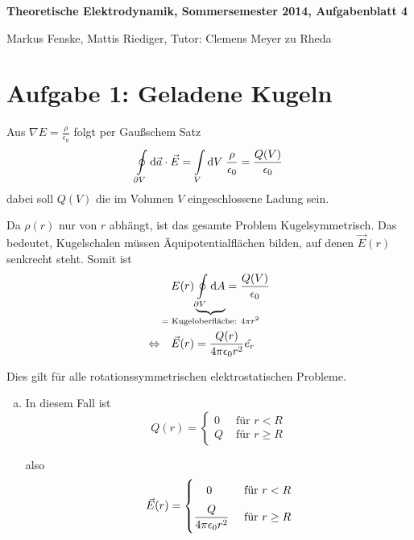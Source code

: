 \documentclass[a4paper,german,12pt,smallheadings]{scrartcl}
\begin{document}
\allowdisplaybreaks %
\begin{center}
\bfseries %
\sffamily %
\vspace{-40pt}
Theoretische Elektrodynamik, Sommersemester 2014, Aufgabenblatt 4

Markus Fenske, Mattis Riediger, Tutor: Clemens Meyer zu Rheda
\vspace{-10pt}
\end{center}

\section*{Aufgabe 1: Geladene Kugeln}
Aus $\nabla E = \frac{\rho}{\epsilon_0}$ folgt per Gaußschem Satz
\begin{equation}
  \oint\limits_{\partial V} \dif \vec{a} \cdot \vec{E} = \int\limits_{V} \dif V \; \frac{\rho}{\epsilon_0} = \frac{Q(V)}{\epsilon_0}
\end{equation}
dabei soll $Q(V)$ die im Volumen $V$ eingeschlossene Ladung sein.

Da $\rho(r)$ nur von $r$ abhängt, ist das gesamte Problem Kugelsymmetrisch.
Das bedeutet, Kugelschalen müssen Äquipotentialflächen bilden, auf denen
$\vec{E}(r)$ senkrecht steht. Somit ist
\begin{align}
  &E(r) \underbrace{\oint\limits_{\partial V} \dif A}_{\mathclap{= \text{ Kugeloberfläche: } 4 \pi r^2}} = \frac{Q(V)}{\epsilon_0} \\
  \Leftrightarrow\quad
  & \vec{E}(r) = \frac{Q(r)}{4 \pi \epsilon_0 r^2} \hat{e_r}
\end{align}

Dies gilt für alle rotationssymmetrischen elektrostatischen Probleme.

\begin{enumerate}[a)]
  \item
    In diesem Fall ist
    \begin{equation}
      Q(r) = \begin{cases}
        0 & \text{ für } r < R \\
        Q & \text{ für } r \ge R
      \end{cases}
    \end{equation}

    also
    \begin{equation}
      \vec{E}(r) = \begin{cases}
        \; \; \; \; 0 & \text{ für } r < R
        \vspace{0.2 cm} \\
        \dfrac{Q}{4 \pi \epsilon_0 r^2} & \text{ für } r \ge R
      \end{cases}
    \end{equation}

\end{enumerate}
\end{document}

